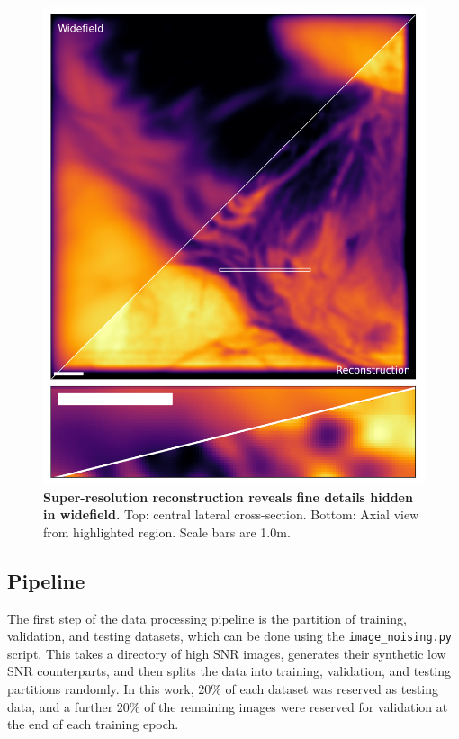 \documentclass[12pt]{article}
\begin{document}
\begin{figure}[hbtp]
    \includegraphics[scale=0.8, center]{figures/3DSIM_recon.png}
    \caption{\textbf{Super-resolution reconstruction reveals fine details hidden in widefield.}
    Top: central lateral cross-section. Bottom: Axial view from highlighted region. Scale bars are 1.0\textmu m.}
    \label{fig:3D_SIM}
\end{figure}

\subsection{Pipeline}

The first step of the data processing pipeline is the partition of training, validation, and testing datasets,
which can be done using the \texttt{image\_noising.py} script.
This takes a directory of high SNR images, generates their synthetic low SNR counterparts,
and then splits the data into training, validation, and testing partitions randomly.
In this work, 20\% of each dataset was reserved as testing data,
and a further 20\% of the remaining images were reserved for validation at the end of each training epoch.
\end{document}
